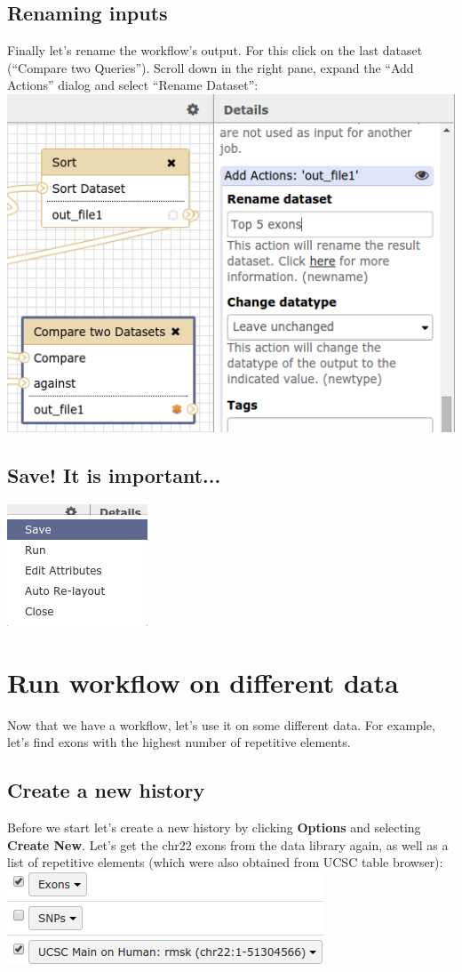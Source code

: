 \documentclass[11pt,a4paper]{article}
\begin{document}
\subsection{Renaming inputs}
Finally let's rename the workflow's output. For this click on the last dataset (``Compare two Queries''). Scroll down in the right pane, expand the ``Add Actions'' dialog and select ``Rename Dataset'':\\
\includegraphics[scale=0.55]{figures/101_34}\\
\subsection{Save! It is important...}
\includegraphics[scale=0.55]{figures/101_35}
\section{Run workflow on different data}
Now that we have a workflow, let's use it on some different data. For example, let's find exons with the highest number of repetitive elements.
\subsection{Create a new history}
Before we start let's create a new history by clicking \textbf{Options} and selecting \textbf{Create New}. Let's get the chr22 exons from the data library again, as well as a list of repetitive elements (which were
also obtained from UCSC table browser):\\
\includegraphics[scale=0.55]{figures/101_36}
\end{document}
